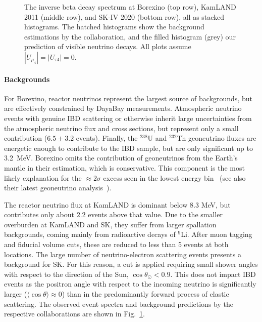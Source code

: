 \documentclass[
reprint,
superscriptaddress,
showpacs,
preprintnumbers,
nofootinbib,
nobibnotes,
amsmath,
amssymb, 
aps,
prd,
floatfix
]{revtex4-1}
\newcommand{\reffig}[1]{Fig.~\ref{#1}}
\begin{document}
\begin{figure}[t]
\caption{The inverse beta decay spectrum at Borexino (top row), KamLAND 2011 (middle row), and SK-IV 2020 (bottom row), all as stacked histograms. The hatched histograms show the background estimations by the collaboration, and the filled histogram (grey) our prediction of visible neutrino decays. All plots assume $|U_{\mu_4}|=|U_{\tau 4}|=0$. \label{fig:exp_spectra}}
\end{figure}

\paragraph{Backgrounds} For Borexino, reactor neutrinos represent the largest source of backgrounds, but are effectively constrained by DayaBay measurements. Atmospheric neutrino events with genuine IBD scattering or otherwise inherit large uncertainties from the atmospheric neutrino flux and cross sections, but represent only a small contribution ($6.5\pm 3.2$ events). Finally, the $^{238}$U and $^{232}$Th geoneutrino fluxes are energetic enough to contribute to the IBD sample, but are only significant up to 3.2~MeV. Borexino omits the contribution of geoneutrinos from the Earth's mantle in their estimation, which is conservative. This component is the most likely explanation for the $\approx 2\sigma$ excess seen in the lowest energy bin~\cite{Agostini:2019yuq} (see also their latest geoneutrino analysis~\cite{Agostini:2019dbs}). 

The reactor neutrino flux at KamLAND is dominant below $8.3$ MeV, but contributes only about $2.2$ events above that value. Due to the smaller overburden at KamLAND and SK, they suffer from larger spallation backgrounds, coming mainly from radioactive decays of $^9$Li. After muon tagging and fiducial volume cuts, these are reduced to less than 5 events at both locations. The large number of neutrino-electron scattering events presents a background for SK. For this reason, a cut is applied requiring small shower angles with respect to the direction of the Sun, $\cos{\theta_{\odot}} < 0.9$. This does not impact IBD events as the positron angle with respect to the incoming neutrino is significantly larger ($\langle \cos{\theta}\rangle \approx  0$) than in the predominantly forward process of elastic scattering. The observed event spectra and background predictions by the respective collaborations are shown in \reffig{fig:exp_spectra}.

\end{document}
